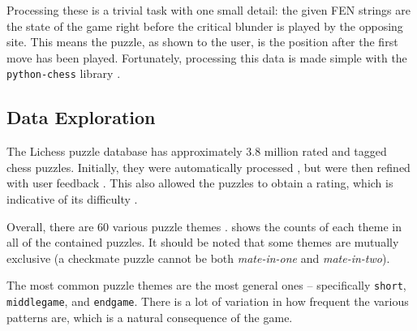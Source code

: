 Processing these is a trivial task with one small detail: the given FEN strings
are the state of the game right before the critical blunder is played by the
opposing site. This means the puzzle, as shown to the user, is the position
after the first move has been played. Fortunately, processing this data is made
simple with the \texttt{python-chess} library \citep{pythonChess}.

\subsection{Data Exploration}

The Lichess puzzle database has approximately 3.8 million rated and tagged
chess puzzles. Initially, they were automatically processed
\citep{lichessTagger}, but were then refined with user feedback
\citep{lichessPuzzles}. This also allowed the puzzles to obtain a rating, which
is indicative of its difficulty \citep{lichessPuzzles}.

Overall, there are 60 various puzzle themes \citep{lichessXML}.
 shows the counts of each theme in all of the contained
puzzles. It should be noted that some themes are mutually exclusive (a
checkmate puzzle cannot be both \emph{mate-in-one} and \emph{mate-in-two}).

The most common puzzle themes are the most general ones -- specifically
\texttt{short}, \texttt{middlegame}, and \texttt{endgame}. There is a lot of
variation in how frequent the various patterns are, which is a natural
consequence of the game.

